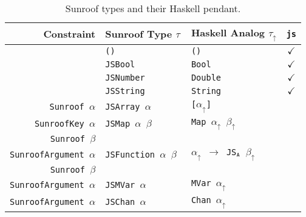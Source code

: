 \documentclass{llncs}
\newcommand{\HaskellAnalog}[1]{#1\ensuremath{_\uparrow}}
\newcommand{\Src}[1]{{\tt{#1}}}
\begin{document}
\begin{table}[t]
\begin{center}
\begin{tabular}{r@{\quad}l@{\quad}l@{\quad}c}
\hline\rule{0pt}{12pt}%
  Constraint
  & Sunroof Type $\tau$
  & Haskell Analog \HaskellAnalog{$\tau$}
  & \Src{js} \\ \hline\rule{0pt}{12pt}%
  
  & \Src{()}       & \Src{()}     & $\checkmark$ \\
  & \Src{JSBool}   & \Src{Bool}   & $\checkmark$ \\
  & \Src{JSNumber} & \Src{Double} & $\checkmark$ \\
  & \Src{JSString} & \Src{String} & $\checkmark$ \\
  
  \Src{Sunroof $\alpha$}
  & \Src{JSArray $\alpha$} 
  & \Src{[$\HaskellAnalog{\alpha}$]}
  & \\
  
  \Src{SunroofKey $\alpha$}
  & \Src{JSMap $\alpha$ $\beta$}
  & \Src{Map $\HaskellAnalog{\alpha}$ $\HaskellAnalog{\beta}$}
  & \\
  \Src{Sunroof $\beta$} \\
  
  \Src{SunroofArgument $\alpha$}
  & \Src{JSFunction $\alpha$ $\beta$ }
  & \Src{$\HaskellAnalog{\alpha}$ $\rightarrow$ JS$_\Src{A}$ $\HaskellAnalog{\beta}$} 
  & \\
  \Src{Sunroof $\beta$} \\
  
  \Src{SunroofArgument $\alpha$}
  & \Src{JSMVar $\alpha$}
  & \Src{MVar $\HaskellAnalog{\alpha}$}
  & \\
  
  \Src{SunroofArgument $\alpha$}
  & \Src{JSChan $\alpha$}
  & \Src{Chan $\HaskellAnalog{\alpha}$}
  & \\[2pt]
\hline
\end{tabular}
\end{center}
\caption{Sunroof types and their Haskell pendant.}
\label{tab:sunroof-classes}
\end{table} 
\end{document}
